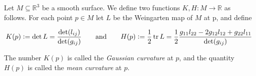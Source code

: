 \vspace{1mm}

\begin{definition}
	Let $M \subseteq \mathbb{R}^3$ be a smooth surface. We define two functions $K,H: M \to \mathbb{R}$ as follows. For each point $p \in M$ let $L$ be the Weingarten map of $M$ at p, and define

	\begin{equation}
		K(p) := \det L = \frac{\det(l_{ij})}{\det(g_{ij})}	\qquad \text{and} \qquad H(p) := \frac{1}{2}\operatorname{tr} L = \frac{1}{2}\frac{g_{11}l_{22} - 2 g_{12}l_{12} + g_{22}l_{11}}{\det(g_{ij})}
	\end{equation}

	The number $K(p)$ is called the \emph{Gaussian curvature} at $p$, and the quantity $H(p)$ is called the \emph{mean curvature} at $p$.
\end{definition}

